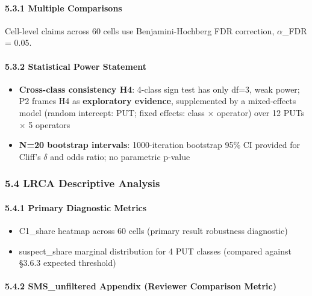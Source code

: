 \documentclass[review,12pt,authoryear]{elsarticle}
\providecommand{\tightlist}{\setlength{\itemsep}{0pt}\setlength{\parskip}{0pt}}
\begin{document}
\paragraph{5.3.1 Multiple Comparisons}\label{multiple-comparisons}

Cell-level claims across 60 cells use Benjamini-Hochberg FDR correction,
$\alpha$\_FDR = 0.05.

\paragraph{5.3.2 Statistical Power
Statement}\label{statistical-power-statement}

\begin{itemize}
\tightlist
\item
  \textbf{Cross-class consistency H4}: 4-class sign test has only df=3,
  weak power; P2 frames H4 as \textbf{exploratory evidence},
  supplemented by a mixed-effects model (random intercept: PUT; fixed
  effects: class $\times$ operator) over 12 PUTs $\times$ 5 operators
\item
  \textbf{N=20 bootstrap intervals}: 1000-iteration bootstrap 95\% CI
  provided for Cliff's $\delta$ and odds ratio; no parametric p-value
\end{itemize}

\subsubsection{5.4 LRCA Descriptive
Analysis}\label{lrca-descriptive-analysis}

\paragraph{5.4.1 Primary Diagnostic
Metrics}\label{primary-diagnostic-metrics}

\begin{itemize}
\tightlist
\item
  C1\_share heatmap across 60 cells (primary result robustness
  diagnostic)
\item
  suspect\_share marginal distribution for 4 PUT classes (compared
  against §3.6.3 expected threshold)
\end{itemize}

\paragraph{5.4.2 SMS\_unfiltered Appendix (Reviewer Comparison
Metric)}\label{sms_unfiltered-appendix-reviewer-comparison-metric}
\end{document}
